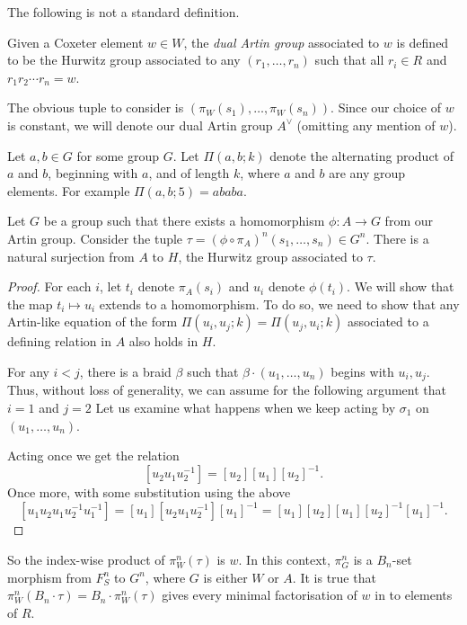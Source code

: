 The following is not a standard definition.
\begin{definition}
	Given a Coxeter element $w \in W$, the \emph{dual Artin group} associated to  $w$ is defined to be the Hurwitz group associated to any $(r_1,\ldots,r_n)$ such that all $r_i \in R$ and  $r_1r_2\cdots r_n=w$.
\end{definition}
The obvious tuple to consider is $(\pi_W(s_1),\ldots,\pi_W(s_n))$.
Since our choice of $w$ is constant, we will denote our dual Artin group  $A^\vee$ (omitting any mention of  $w$).

Let $a,b \in G$ for some group  $G$.
Let $\Pi(a,b;k)$ denote the alternating product of $a$ and  $b$, beginning with $a$, and of length  $k$, where  $a$ and  $b$ are any group elements.
For example  $\Pi(a,b;5)=ababa$.
\begin{lemma}
	Let $G$ be a group such that there exists a homomorphism $\phi \colon A \to G$ from our Artin group.
	Consider the tuple $\tau = (\phi \circ \pi_A)^n(s_1,\ldots,s_n) \in G^n$.
	There is a natural surjection from $A$ to $H$, the Hurwitz group associated to $\tau$.
\end{lemma}
\begin{proof}
	For each $i$, let $t_i$ denote  $\pi_A(s_i)$ and  $u_i$ denote  $\phi(t_i)$.
	We will show that the map $t_i \mapsto u_i$ extends to a homomorphism.
	To do so, we need to show that any Artin-like equation of the form $\Pi(u_i,u_j;k) = \Pi(u_j,u_i;k)$ associated to a defining relation in $A$ also holds in $H$.

	For any $i < j$, there is a braid $\beta$ such that  $\beta \cdot (u_1,\ldots,u_n)$ begins with $u_i,u_j$.
	Thus, without loss of generality, we can assume for the following argument that $i=1$ and  $j=2$
	Let us examine what happens when we keep acting by $\sigma_1$ on  $(u_1,\ldots,u_n)$.

	Acting once we get the relation
	\[
		[u_2u_1u_2^{-1}]=[u_2][u_1][u_2]^{-1}
		.\]
	Once more, with some substitution using the above
	\[
		[u_1u_2u_1u_2^{-1}u_1^{-1}] = [u_1][u_2u_1u_2^{-1}][u_1]^{-1} = [u_1][u_2][u_1][u_2]^{-1}[u_1]^{-1}
		.\]
\end{proof}
So the index-wise product of  $\pi^n_W(\tau)$ is  $w$.
In this context, $\pi^n_G$ is a  $B_n$-set morphism from  $F_S^n$ to  $G^n$, where $G$ is either  $W$ or  $A$.
It is true that $\pi_W^n(B_n \cdot \tau)= B_n \cdot \pi^n_W(\tau)$ gives every minimal factorisation of  $w$ in to elements of $R$.

